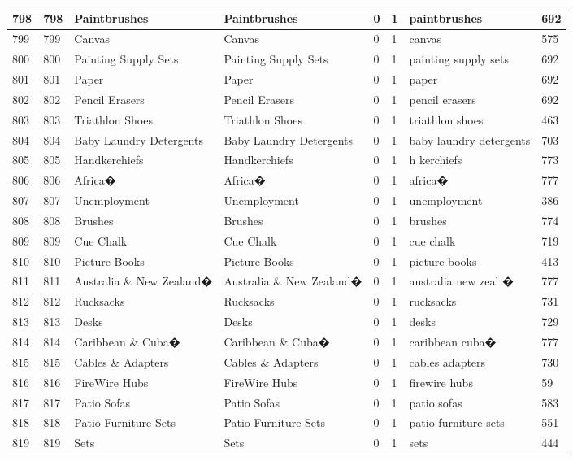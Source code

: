 \begin{longtable}{|l|l|l|l|l|l|l|l|}
798 & 798 & Paintbrushes & Paintbrushes & 0 & 1 & paintbrushes & 692 \\ \hline 
799 & 799 & Canvas & Canvas & 0 & 1 & canvas & 575 \\ \hline 
800 & 800 & Painting Supply Sets & Painting Supply Sets & 0 & 1 & painting supply sets & 692 \\ \hline 
801 & 801 & Paper & Paper & 0 & 1 & paper & 692 \\ \hline 
802 & 802 & Pencil Erasers & Pencil Erasers & 0 & 1 & pencil erasers & 692 \\ \hline 
803 & 803 & Triathlon Shoes & Triathlon Shoes & 0 & 1 & triathlon shoes & 463 \\ \hline 
804 & 804 & Baby Laundry Detergents & Baby Laundry Detergents & 0 & 1 & baby laundry detergents & 703 \\ \hline 
805 & 805 & Handkerchiefs & Handkerchiefs & 0 & 1 & h kerchiefs & 773 \\ \hline 
806 & 806 & Africa� & Africa� & 0 & 1 & africa� & 777 \\ \hline 
807 & 807 & Unemployment & Unemployment & 0 & 1 & unemployment & 386 \\ \hline 
808 & 808 & Brushes & Brushes & 0 & 1 & brushes & 774 \\ \hline 
809 & 809 & Cue Chalk & Cue Chalk & 0 & 1 & cue chalk & 719 \\ \hline 
810 & 810 & Picture Books & Picture Books & 0 & 1 & picture books & 413 \\ \hline 
811 & 811 & Australia \& New Zealand� & Australia \& New Zealand� & 0 & 1 & australia new zeal � & 777 \\ \hline 
812 & 812 & Rucksacks & Rucksacks & 0 & 1 & rucksacks & 731 \\ \hline 
813 & 813 & Desks & Desks & 0 & 1 & desks & 729 \\ \hline 
814 & 814 & Caribbean \& Cuba� & Caribbean \& Cuba� & 0 & 1 & caribbean cuba� & 777 \\ \hline 
815 & 815 & Cables \& Adapters & Cables \& Adapters & 0 & 1 & cables adapters & 730 \\ \hline 
816 & 816 & FireWire Hubs & FireWire Hubs & 0 & 1 & firewire hubs & 59 \\ \hline 
817 & 817 & Patio Sofas & Patio Sofas & 0 & 1 & patio sofas & 583 \\ \hline 
818 & 818 & Patio Furniture Sets & Patio Furniture Sets & 0 & 1 & patio furniture sets & 551 \\ \hline 
819 & 819 & Sets & Sets & 0 & 1 & sets & 444 \\ \hline 

\end{longtable}
